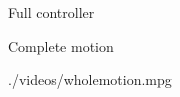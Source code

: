 
\begin{frame}{Full controller}
  \scalebox{0.7}{} \\
%

%
\end{frame}

\begin{frame}{Complete motion}
  \begin{center}
    {./videos/wholemotion.mpg}
  \end{center}
\end{frame}
